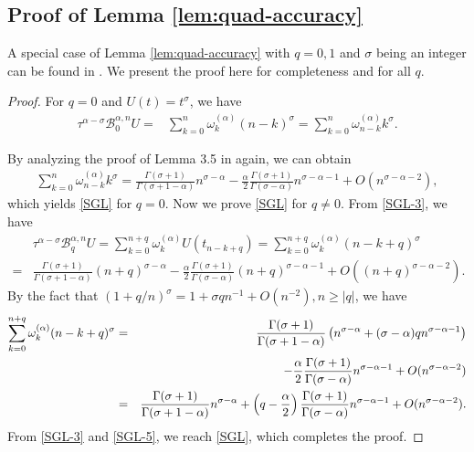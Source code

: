 \documentclass[10pt]{siamltex}
\newcommand{\sfrac}[2]{ {#1}/{#2}}
\begin{document}
\subsection{Proof of Lemma \ref{lem:quad-accuracy} }A special case of Lemma \ref{lem:quad-accuracy} with $q=0,1$ and  $\sigma$
being an integer can be found in \cite{Sousa12}. We present the proof here for completeness and for all $q$.
\begin{proof}
For $q=0$ and $U(t)=t^{\sigma}$, we have
\begin{equation}\label{SGL-2}\begin{aligned}
\tau^{\alpha-\sigma}\mathcal{B}^{\alpha,n}_{0}U
=&\sum_{k=0}^{n}\omega^{(\alpha)}_{k}(n-k)^{\sigma}
=\sum_{k=0}^{n}\omega^{(\alpha)}_{n-k}k^{\sigma}.
\end{aligned}\end{equation}

By  analyzing the proof of Lemma 3.5 in \cite{Lub86} again, we can obtain
\begin{equation}\label{SGL-3}\begin{aligned}
\sum_{k=0}^{n}\omega^{(\alpha)}_{n-k}k^{\sigma}=\frac{\Gamma(\sigma+1)}{\Gamma(\sigma+1-\alpha)}n^{\sigma-\alpha}
-\frac{\alpha}{2}\frac{\Gamma(\sigma+1)}{\Gamma(\sigma-\alpha)}n^{\sigma-\alpha-1}
+O(n^{\sigma-\alpha-2}),
\end{aligned}\end{equation}
which yields  \eqref{SGL} for $q=0$.
Now we prove \eqref{SGL} for $q\neq 0$.  From \eqref{SGL-3}, we have
\begin{equation}\label{SGL-4}\begin{aligned}
&\tau^{\alpha-\sigma}\mathcal{B}^{\alpha,n}_{q}U
=\sum_{k=0}^{n+q}\omega^{(\alpha)}_{k}U(t_{n-k+q})
=\sum_{k=0}^{n+q}\omega^{(\alpha)}_{k}(n-k+q)^{\sigma}\\
=&\frac{\Gamma(\sigma+1)}{\Gamma(\sigma+1-\alpha)}(n+q)^{\sigma-\alpha}
-\frac{\alpha}{2}\frac{\Gamma(\sigma+1)}{\Gamma(\sigma-\alpha)}(n+q)^{\sigma-\alpha-1}
+O((n+q)^{\sigma-\alpha-2}).
\end{aligned}\end{equation}
By the fact that $\left(1+\sfrac{q}{n}\right)^{\sigma}=1+{\sigma}qn^{-1}+O(n^{-2}),n\geq|q|$,
we have
\begin{eqnarray}\label{SGL-5}
\sum_{k=0}^{n+q}\omega^{(\alpha)}_{k}(n-k+q)^{\sigma}
&=&\frac{\Gamma(\sigma+1)}{\Gamma(\sigma+1-\alpha)}
\left(n^{\sigma-\alpha}+{(\sigma-\alpha)}qn^{\sigma-\alpha-1}\right) \notag \\
&& -\frac{\alpha}{2}\frac{\Gamma(\sigma+1)}{\Gamma(\sigma-\alpha)}n^{\sigma-\alpha-1}+O(n^{\sigma-\alpha-2}) \\
&=&\frac{\Gamma(\sigma+1)}{\Gamma(\sigma+1-\alpha)}n^{\sigma-\alpha}
+\left(q-\frac{\alpha}{2}\right)\frac{\Gamma(\sigma+1)}{\Gamma(\sigma-\alpha)}n^{\sigma-\alpha-1}
+O(n^{\sigma-\alpha-2}). \notag
 \end{eqnarray}
From \eqref{SGL-3} and \eqref{SGL-5}, we reach \eqref{SGL}, which completes the proof.
\end{proof}
\end{document}
